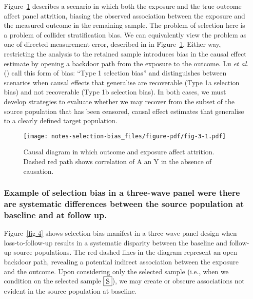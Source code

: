 \documentclass[
  singlecolumn,
  9pt]{article}
\begin{document}
Figure~\ref{fig-3} describes a scenario in which both the exposure and
the true outcome affect panel attrition, biasing the observed
association between the exposure and the measured outcome in the
remaining sample. The problem of selection here is a problem of collider
stratification bias. We can equivalently view the problem as one of
directed measurement error, described in in Figure~\ref{fig-3}. Either
way, restricting the analysis to the retained sample introduces bias in
the causal effect estimate by opening a backdoor path from the exposure
to the outcome. Lu \emph{et al.} () call this
form of bias: ``Type 1 selection bias'' and distinguishes between
scenarios when causal effects that generalise are recoverable (Type 1a
selection bias) and not recoverable (Type 1b selection bias). In both
cases, we must develop strategies to evaluate whether we may recover
from the subset of the source population that has been censored, causal
effect estimates that generalise to a clearly defined target population.

\begin{figure}

{\centering \texttt{[image: notes-selection-bias\_files/figure-pdf/fig-3-1.pdf]}

}

\caption{\label{fig-3}Causal diagram in which outcome and exposure
affect attrition. Dashed red path shows correlation of A an Y in the
absence of causation.}

\end{figure}

\subsubsection{Example of selection bias in a three-wave panel were
there are systematic differences between the source population at
baseline and at follow
up.}\label{example-of-selection-bias-in-a-three-wave-panel-were-there-are-systematic-differences-between-the-source-population-at-baseline-and-at-follow-up.}

Figure~\ref{fig-4} shows selection bias manifest in a three-wave panel
design when loss-to-follow-up results in a systematic disparity between
the baseline and follow-up source populations. The red dashed lines in
the diagram represent an open backdoor path, revealing a potential
indirect association between the exposure and the outcome. Upon
considering only the selected sample (i.e., when we condition on the
selected sample \(\framebox{S}\)), we may create or obscure associations
not evident in the source population at baseline.
\end{document}
